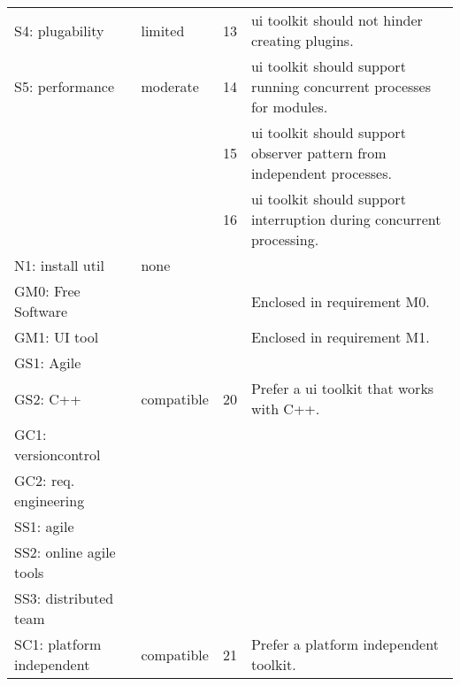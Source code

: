 \begin{center}
\begin{longtable}{ll||cp{21em}}
        S4: plugability      & limited      & 13  & ui toolkit should not hinder creating plugins.\\
        S5: performance	     & moderate     & 14  & ui toolkit should support running concurrent processes for modules.\\
	                         &              & 15  & ui toolkit should support observer pattern from independent processes.\\
	                         &              & 16  & ui toolkit should support interruption during concurrent processing.\\
        N1: install util     & none    		&     & \\\hline
		GM0: Free Software  &              &     & Enclosed in requirement M0.\\
        GM1: UI tool	    &              &     & Enclosed in requirement M1.\\
        GS1: Agile	        &              &     & \\
        GS2: C++	        & compatible   & 20  & Prefer a ui toolkit that works with C++.\\
        GC1: versioncontrol &              &     & \\
        GC2: req. engineering
						    &              &     & \\\hline
        SS1: agile	        &              &     & \\
        SS2: online agile tools
							&              &     & \\
        SS3: distributed team
							&              &     & \\
        SC1: platform independent
							& compatible   & 21  & Prefer a platform independent toolkit.\\
    \end{longtable}
    \label{tab:uitool-requirements}
\end{center}
